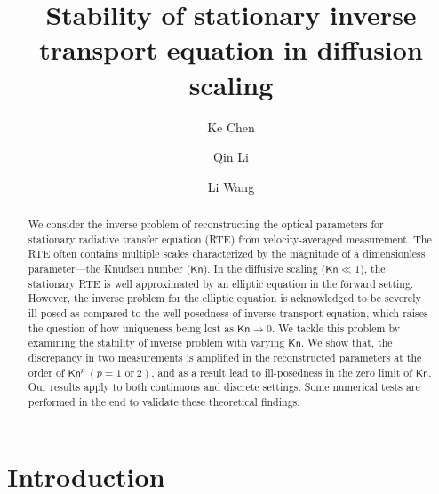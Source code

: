 \documentclass[english,reqno]{amsart}
\title{Stability of stationary inverse transport equation in diffusion scaling}
\author{Ke Chen}
\author{Qin Li}
\author{Li Wang}
\theoremstyle{plain}
\theoremstyle{definition} %
\newcommand{\Kn}{\mathsf{Kn}}
\begin{document}
\maketitle


\begin{abstract}
We consider the inverse problem of reconstructing the optical parameters for stationary radiative transfer equation (RTE) from velocity-averaged measurement. The RTE often contains multiple scales characterized by the magnitude of a dimensionless parameter---the Knudsen number ($\Kn$). In the diffusive scaling ($\Kn \ll 1$), the stationary RTE is well approximated by an elliptic equation in the forward setting. However, the inverse problem for the elliptic equation is acknowledged to be severely ill-posed as compared to the well-posedness of inverse transport equation, which raises the question of how uniqueness being lost as $\Kn \rightarrow 0$. We tackle this problem by examining the stability of inverse problem with varying $\Kn$. We show that, the discrepancy in two measurements is amplified in the reconstructed parameters at the order of $\Kn^p~ (p = 1\text{ or} ~2)$, and as a result lead to ill-posedness in the zero limit of $\Kn$. Our results apply to both continuous and discrete settings. Some numerical tests are performed in the end to validate these theoretical findings. 
\end{abstract}


\section{Introduction}
\end{document}
